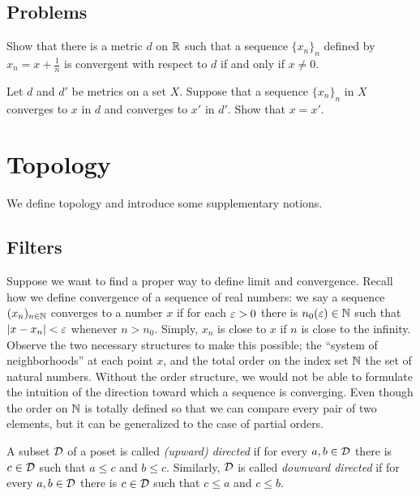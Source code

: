 \documentclass{../crs}
\begin{document}














\subsection*{Problems}
\begin{prb}
Show that there is a metric $d$ on $\mathbb{R}$ such that a sequence $\{x_n\}_n$ defined by $x_n=x+\frac1n$ is convergent with respect to $d$ if and only if $x\ne0$.
\end{prb}
\begin{prb}
Let $d$ and $d'$ be metrics on a set $X$.
Suppose that a sequence $\{x_n\}_n$ in $X$ converges to $x$ in $d$ and converges to $x'$ in $d'$.
Show that $x=x'$.
\end{prb}











\section{Topology}
We define topology and introduce some supplementary notions.




\subsection{Filters}
Suppose we want to find a proper way to define limit and convergence.
Recall how we define convergence of a sequence of real numbers: we say a sequence $(x_n)_{n\in\mathbb{N}}$ converges to a number $x$ if for each $\varepsilon>0$ there is $n_0(\varepsilon)\in\mathbb{N}$ such that $|x-x_n|<\varepsilon$ whenever $n>n_0$.
Simply, $x_n$ is close to $x$ if $n$ is close to the infinity.
Observe the two necessary structures to make this possible; the ``system of neighborhoods'' at each point $x$, and the total order on the index set $\mathbb{N}$ the set of natural numbers.
Without the order structure, we would not be able to formulate the intuition of the direction toward which a sequence is converging.
Even though the order on $\mathbb{N}$ is totally defined so that we can compare every pair of two elements, but it can be generalized to the case of partial orders.
\begin{defn}
A subset $\mathcal{D}$ of a poset is called \emph{(upward) directed} if for every $a,b\in\mathcal{D}$ there is $c\in\mathcal{D}$ such that $a\le c$ and $b\le c$.
Similarly, $\mathcal{D}$ is called \emph{downward directed} if for every $a,b\in\mathcal{D}$ there is $c\in\mathcal{D}$ such that $c\le a$ and $c\le b$.
\end{defn}
\end{document}
